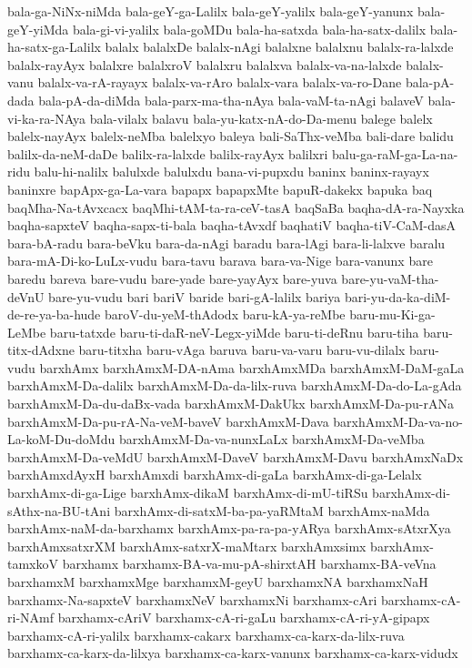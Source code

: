 {bala-ga-NiNx-niMda
bala-geY-ga-Lalilx
bala-geY-yalilx
bala-geY-yanunx
bala-geY-yiMda
bala-gi-vi-yalilx
bala-goMDu
bala-ha-satxda
bala-ha-satx-dalilx
bala-ha-satx-ga-Lalilx
balalx
balalxDe
balalx-nAgi
balalxne
balalxnu
balalx-ra-lalxde
balalx-rayAyx
balalxre
balalxroV
balalxru
balalxva
balalx-va-na-lalxde
balalx-vanu
balalx-va-rA-rayayx
balalx-va-rAro
balalx-vara
balalx-va-ro-Dane
bala-pA-dada
bala-pA-da-diMda
bala-parx-ma-tha-nAya
bala-vaM-ta-nAgi
balaveV
bala-vi-ka-ra-NAya
bala-vilalx
balavu
bala-yu-katx-nA-do-Da-menu
balege
balelx
balelx-nayAyx
balelx-neMba
balelxyo
baleya
bali-SaThx-veMba
bali-dare
balidu
balilx-da-neM-daDe
balilx-ra-lalxde
balilx-rayAyx
balilxri
balu-ga-raM-ga-La-na-ridu
balu-hi-nalilx
balulxde
balulxdu
bana-vi-pupxdu
baninx
baninx-rayayx
baninxre
bapApx-ga-La-vara
bapapx
bapapxMte
bapuR-dakekx
bapuka
baq
baqMha-Na-tAvxcacx
baqMhi-tAM-ta-ra-ceV-tasA
baqSaBa
baqha-dA-ra-Nayxka
baqha-sapxteV
baqha-sapx-ti-bala
baqha-tAvxdf
baqhatiV
baqha-tiV-CaM-dasA
bara-bA-radu
bara-beVku
bara-da-nAgi
baradu
bara-lAgi
bara-li-lalxve
baralu
bara-mA-Di-ko-LuLx-vudu
bara-tavu
barava
bara-va-Nige
bara-vanunx
bare
baredu
bareva
bare-vudu
bare-yade
bare-yayAyx
bare-yuva
bare-yu-vaM-tha-deVnU
bare-yu-vudu
bari
bariV
baride
bari-gA-lalilx
bariya
bari-yu-da-ka-diM-de-re-ya-ba-hude
baroV-du-yeM-thAdodx
baru-kA-ya-reMbe
baru-mu-Ki-ga-LeMbe
baru-tatxde
baru-ti-daR-neV-Legx-yiMde
baru-ti-deRnu
baru-tiha
baru-titx-dAdxne
baru-titxha
baru-vAga
baruva
baru-va-varu
baru-vu-dilalx
baru-vudu
barxhAmx
barxhAmxM-DA-nAma
barxhAmxMDa
barxhAmxM-DaM-gaLa
barxhAmxM-Da-dalilx
barxhAmxM-Da-da-lilx-ruva
barxhAmxM-Da-do-La-gAda
barxhAmxM-Da-du-daBx-vada
barxhAmxM-DakUkx
barxhAmxM-Da-pu-rANa
barxhAmxM-Da-pu-rA-Na-veM-baveV
barxhAmxM-Dava
barxhAmxM-Da-va-no-La-koM-Du-doMdu
barxhAmxM-Da-va-nunxLaLx
barxhAmxM-Da-veMba
barxhAmxM-Da-veMdU
barxhAmxM-DaveV
barxhAmxM-Davu
barxhAmxNaDx
barxhAmxdAyxH
barxhAmxdi
barxhAmx-di-gaLa
barxhAmx-di-ga-Lelalx
barxhAmx-di-ga-Lige
barxhAmx-dikaM
barxhAmx-di-mU-tiRSu
barxhAmx-di-sAthx-na-BU-tAni
barxhAmx-di-satxM-ba-pa-yaRMtaM
barxhAmx-naMda
barxhAmx-naM-da-barxhamx
barxhAmx-pa-ra-pa-yARya
barxhAmx-sAtxrXya
barxhAmxsatxrXM
barxhAmx-satxrX-maMtarx
barxhAmxsimx
barxhAmx-tamxkoV
barxhamx
barxhamx-BA-va-mu-pA-shirxtAH
barxhamx-BA-veVna
barxhamxM
barxhamxMge
barxhamxM-geyU
barxhamxNA
barxhamxNaH
barxhamx-Na-sapxteV
barxhamxNeV
barxhamxNi
barxhamx-cAri
barxhamx-cA-ri-NAmf
barxhamx-cAriV
barxhamx-cA-ri-gaLu
barxhamx-cA-ri-yA-gipapx
barxhamx-cA-ri-yalilx
barxhamx-cakarx
barxhamx-ca-karx-da-lilx-ruva
barxhamx-ca-karx-da-lilxya
barxhamx-ca-karx-vanunx
barxhamx-ca-karx-vidudx
}
